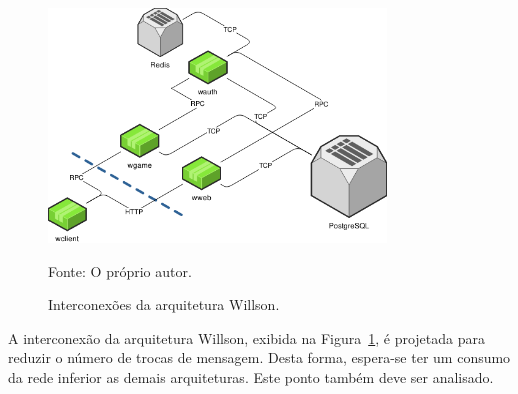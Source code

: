 \begin{figure}[htb!]
  \caption{Interconexões da arquitetura Willson.}
  \label{fig:interconexao_willson}
  \includegraphics[width=0.8\textwidth]{figuras/interconexoes/willson.png}
  \centering

  Fonte: O próprio autor.
\end{figure}

A interconexão da arquitetura Willson, exibida na Figura~\ref{fig:interconexao_willson}, é projetada para reduzir o número de trocas de mensagem.
%
Desta forma, espera-se ter um consumo da rede inferior as demais arquiteturas. Este ponto também deve ser analisado.
